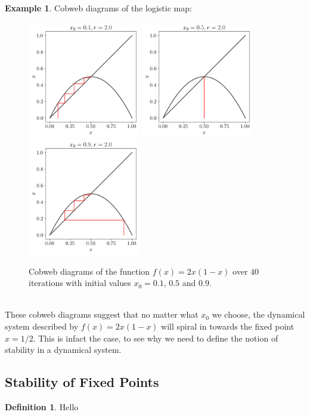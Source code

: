 \documentclass[11pt]{article}
\theoremstyle{definition}
\newtheorem{exmp}{Example}[section]
\newtheorem{definition}{Definition}[section]
\begin{document}
\begin{exmp} Cobweb diagrams of the logistic map:
    \begin{figure}[h]
        \centering
        \includegraphics[width=4.9cm]{cobweb_0.1_2.0}
        \includegraphics[width=4.9cm]{cobweb_0.5_2.0}
        \includegraphics[width=4.9cm]{cobweb_0.9_2.0}
        \caption{Cobweb diagrams of the function $f(x) = 2x(1-x)$ over $40$ iterations with initial values $x_0 = 0.1$, $0.5$ and $0.9$.}
    \end{figure}
    \\
    These cobweb diagrams suggest that no matter what $x_0$ we choose, the dynamical system described by $f(x) = 2x(1-x)$ will spiral in towards the fixed point $x = 1/2$. This is infact the case, to see why we need to define the notion of stability in a dynamical system.
\end{exmp}
\subsection{Stability of Fixed Points}
\begin{definition}
    Hello
\end{definition}
\end{document}
